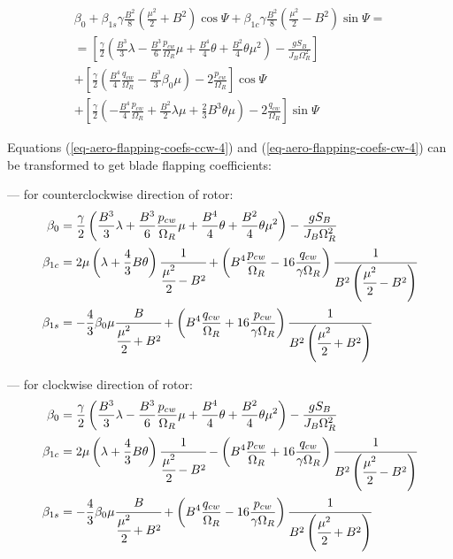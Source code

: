 \begin{multline}
  \label{eq-aero-flapping-coefs-cw-4}
  \beta_0
  +
  \beta_{1s} \gamma \frac{B^2}{8}
  \left( \frac{\mu^2}{2} + B^2 \right) \cos \Psi
  +
  \beta_{1c} \gamma \frac{B^2}{8}
  \left( \frac{\mu^2}{2} - B^2 \right) \sin \Psi
  = \\ =
  \left[
    \frac{\gamma}{2}
    \left(
        \frac{B^3}{3} \lambda
      - \frac{B^3}{6} \frac{p_{cw}}{\Omega_R} \mu
      + \frac{B^4}{4} \theta
      + \frac{B^2}{4} \theta \mu^2
    \right) - \frac{ g S_B }{ J_B \Omega_R^2 }
  \right]
  \\
  + \left[
    \frac{\gamma}{2}
    \left(
      \frac{B^4}{4} \frac{q_{cw}}{\Omega_R}
      - \frac{B^3}{3} \beta_0 \mu
    \right) - 2 \frac{p_{cw}}{\Omega_R}
  \right] \cos \Psi
  \\
  + \left[
    \frac{\gamma}{2}
    \left(
      - \frac{B^4}{4} \frac{p_{cw}}{\Omega_R}
      + \frac{B^2}{2} \lambda \mu
      + \frac{2}{3} B^3 \theta \mu
    \right) - 2 \frac{q_{cw}}{\Omega_R}
  \right] \sin \Psi
\end{multline}

\clearpage

Equations (\ref{eq-aero-flapping-coefs-ccw-4}) and (\ref{eq-aero-flapping-coefs-cw-4}) can be transformed to get blade flapping coefficients:

--- for counterclockwise direction of rotor:
\begin{align}
  \beta_0 &=
  \frac{\gamma}{2}
  \left(
      \frac{B^3}{3} \lambda 
    + \frac{B^3}{6} \frac{p_{cw}}{\Omega_R} \mu
    + \frac{B^4}{4} \theta
    + \frac{B^2}{4} \theta \mu^2
  \right) - \frac{ g S_B }{ J_B \Omega_R^2 }
  \\
  \beta_{1c} &=
  2 \mu \left( \lambda + \frac{4}{3} B \theta \right)
  \cfrac{1}{\cfrac{\mu^2}{2} - B^2}
  +
  \left(
      B^4 \frac{p_{cw}}{\Omega_R}
    - 16 \frac{q_{cw}}{\gamma \Omega_R}
  \right)
  \cfrac{1}{B^2\left(\cfrac{\mu^2}{2}-B^2\right)}
  \\
  \beta_{1s} &=
  - \frac{4}{3} \beta_0 \mu
  \cfrac{B}{\cfrac{\mu^2}{2} + B^2}
  +
  \left(
      B^4 \frac{q_{cw}}{\Omega_R} 
    + 16 \frac{p_{cw}}{\gamma \Omega_R}
  \right)
  \cfrac{1}{B^2 \left(\cfrac{\mu^2}{2}+B^2\right)}
\end{align}

--- for clockwise direction of rotor:
\begin{align}
  \beta_0 &=
  \frac{\gamma}{2}
  \left(
      \frac{B^3}{3} \lambda 
    - \frac{B^3}{6} \frac{p_{cw}}{\Omega_R} \mu
    + \frac{B^4}{4} \theta
    + \frac{B^2}{4} \theta \mu^2
  \right) - \frac{ g S_B }{ J_B \Omega_R^2 }
  \\
  \beta_{1c} &=
  2 \mu \left( \lambda + \frac{4}{3} B \theta \right)
  \cfrac{1}{\cfrac{\mu^2}{2} - B^2}
  -
  \left(
      B^4 \frac{p_{cw}}{\Omega_R}
    + 16 \frac{q_{cw}}{\gamma \Omega_R}
  \right)
  \cfrac{1}{B^2\left(\cfrac{\mu^2}{2}-B^2\right)}
  \\
  \beta_{1s} &=
  - \frac{4}{3} \beta_0 \mu
  \cfrac{B}{\cfrac{\mu^2}{2} + B^2}
  +
  \left(
      B^4 \frac{q_{cw}}{\Omega_R} 
    - 16 \frac{p_{cw}}{\gamma \Omega_R}
  \right)
  \cfrac{1}{B^2 \left(\cfrac{\mu^2}{2}+B^2\right)}
\end{align}
